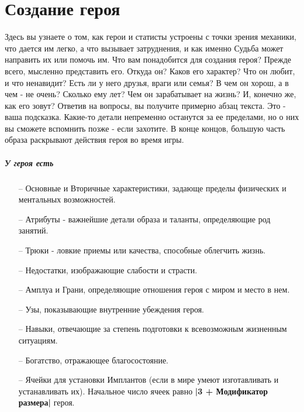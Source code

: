 \chapter{Создание героя}
Здесь вы узнаете о том, как герои и статисты устроены с точки зрения механики, что дается им легко, а что вызывает затруднения, и как именно Судьба может направить их или помочь им.
\newline Что вам понадобится для создания героя? Прежде всего, мысленно представить его. Откуда он? Каков его характер? Что он любит, и что ненавидит? Есть ли у него друзья, враги или семья? В чем он хорош, а в чем - не очень? Сколько ему лет? Чем он зарабатывает на жизнь? И, конечно же, как его зовут?
\newline Ответив на вопросы, вы получите примерно абзац текста. Это - ваша подсказка. Какие-то детали непременно останутся за ее пределами, но о них вы сможете вспомнить позже - если захотите. В конце концов, большую часть образа раскрывают действия героя во время игры. 

\paragraph{У героя есть}
\begin{itemize}
\item[--] Основные и Вторичные характеристики, задающе пределы физических и ментальных возможностей.
\item[--] Атрибуты - важнейшие детали образа и таланты, определяющие род занятий.
\item[--] Трюки - ловкие приемы или качества, способные облегчить жизнь.
\item[--] Недостатки, изображающие слабости и страсти.
\item[--] Амплуа и Грани, определяющие отношения героя с миром и место в нем.
\item[--] Узы, показывающие внутренние убеждения героя.
\item[--] Навыки, отвечающие за степень подготовки к всевозможным жизненным ситуациям.
\item[--] Богатство, отражающее благосостояние.
\item[--] Ячейки для установки Имплантов (если в мире умеют изготавливать и устанавливать их). Начальное число ячеек равно \textbf{|3 + Модификатор размера|} героя.
\end{itemize}



